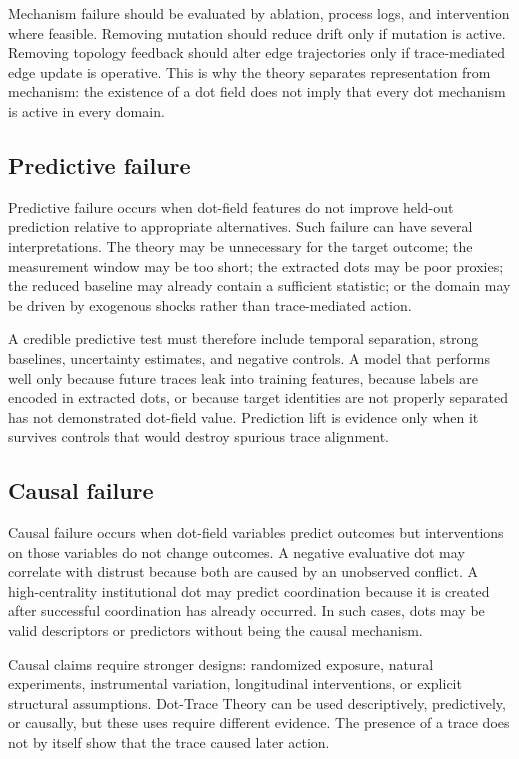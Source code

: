 \documentclass[11pt]{article}
\theoremstyle{remark}
\begin{document}
Mechanism failure should be evaluated by ablation, process logs, and intervention where feasible. Removing mutation should reduce drift only if mutation is active. Removing topology feedback should alter edge trajectories only if trace-mediated edge update is operative. This is why the theory separates representation from mechanism: the existence of a dot field does not imply that every dot mechanism is active in every domain.

\subsection{Predictive failure}\label{predictive-failure}

Predictive failure occurs when dot-field features do not improve held-out prediction relative to appropriate alternatives. Such failure can have several interpretations. The theory may be unnecessary for the target outcome; the measurement window may be too short; the extracted dots may be poor proxies; the reduced baseline may already contain a sufficient statistic; or the domain may be driven by exogenous shocks rather than trace-mediated action.

A credible predictive test must therefore include temporal separation, strong baselines, uncertainty estimates, and negative controls. A model that performs well only because future traces leak into training features, because labels are encoded in extracted dots, or because target identities are not properly separated has not demonstrated dot-field value. Prediction lift is evidence only when it survives controls that would destroy spurious trace alignment.

\subsection{Causal failure}\label{causal-failure}

Causal failure occurs when dot-field variables predict outcomes but interventions on those variables do not change outcomes. A negative evaluative dot may correlate with distrust because both are caused by an unobserved conflict. A high-centrality institutional dot may predict coordination because it is created after successful coordination has already occurred. In such cases, dots may be valid descriptors or predictors without being the causal mechanism.

Causal claims require stronger designs: randomized exposure, natural experiments, instrumental variation, longitudinal interventions, or explicit structural assumptions. Dot-Trace Theory can be used descriptively, predictively, or causally, but these uses require different evidence. The presence of a trace does not by itself show that the trace caused later action.
\end{document}
